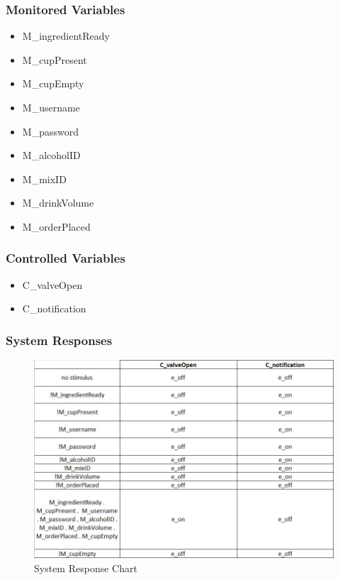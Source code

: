 \documentclass{article}
\begin{document}
\subsubsection{Monitored Variables} %
    \begin{itemize}
        \item M\_ingredientReady
        \item M\_cupPresent
        \item M\_cupEmpty
        \item M\_username
        \item M\_password
        \item M\_alcoholID
        \item M\_mixID
        \item M\_drinkVolume
        \item M\_orderPlaced
    \end{itemize}
    
\subsubsection{Controlled Variables} %
    \begin{itemize}
        \item C\_valveOpen
        \item C\_notification
    \end{itemize}
\subsubsection{System Responses}
    
    \begin{figure}[H]
    \centerline{\includegraphics[scale=0.9]{SystemResponse.JPG}}
    \caption{System Response Chart}
    \label{fig}
    \end{figure}
\end{document}
